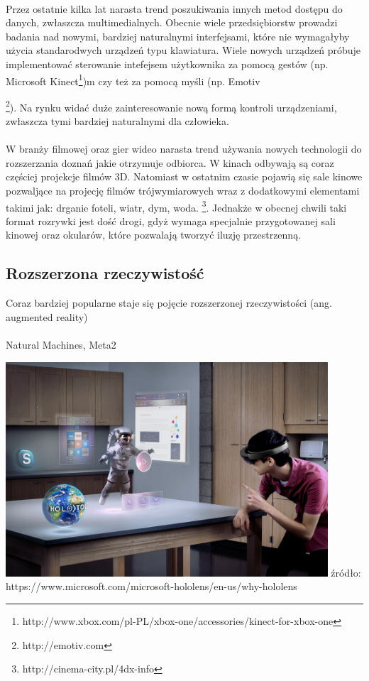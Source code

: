 \documentclass[12pt]{article}
\begin{document}
\paragraph{}
Przez ostatnie kilka lat narasta trend poszukiwania innych metod dostępu do danych, zwłaszcza multimedialnych. Obecnie wiele przedsiębiorstw prowadzi badania nad nowymi, bardziej naturalnymi interfejsami, które nie wymagałyby użycia standarodwych urządzeń typu klawiatura.
Wiele nowych urządzeń próbuje implementować sterowanie intefejsem użytkownika za pomocą gestów (np. Microsoft Kinect\footnote{http://www.xbox.com/pl-PL/xbox-one/accessories/kinect-for-xbox-one})m czy też za pomocą myśli (np. Emotiv {\footnote{http://emotiv.com}). Na rynku widać duże zainteresowanie nową formą kontroli urządzeniami, zwłaszcza tymi bardziej naturalnymi dla człowieka.
\paragraph{}
W branży filmowej oraz gier wideo narasta trend używania nowych technologii do rozszerzania doznań jakie otrzymuje odbiorca.
W kinach odbywają są coraz częściej projekcje filmów 3D. Natomiast w ostatnim czasie pojawią się sale kinowe pozwaljące  na projecję filmów trójwymiarowych wraz z dodatkowymi elementami takimi jak: drganie foteli, wiatr, dym, woda. \footnote{http://cinema-city.pl/4dx-info}. Jednakże w obecnej chwili taki format rozrywki jest dość drogi, gdyż wymaga specjalnie przygotowanej sali kinowej oraz okularów, które pozwalają tworzyć iluzję przestrzenną. 

\subsection{Rozszerzona rzeczywistość}
Coraz bardziej popularne staje się pojęcie rozszerzonej rzeczywistości (ang. augmented reality)

\paragraph{}
Natural Machines, Meta2
\begin{center}
\includegraphics[width=0.9\textwidth]{images/hololens.png}
\small {źródło: https://www.microsoft.com/microsoft-hololens/en-us/why-hololens }
\end{center}


}
\end{document}
